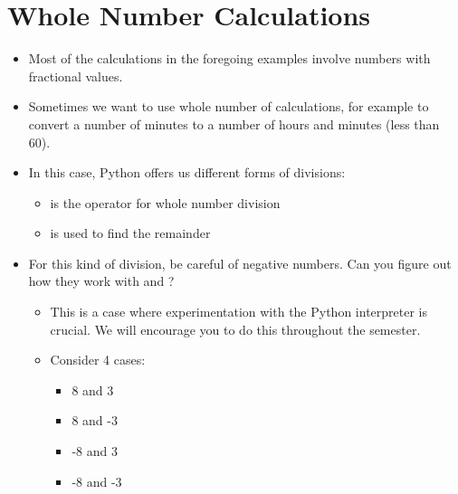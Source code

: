 \documentclass[letterpaper,10pt,english]{sphinxmanual}
\begin{document}
\section{Whole Number Calculations}
\label{\detokenize{lecture_notes/lec02_calculator:whole-number-calculations}}\begin{itemize}
\item {} 
Most of the calculations in the foregoing examples involve numbers
with fractional values.

\item {} 
Sometimes we want to use whole number of calculations, for example
to convert a number of minutes to a number of hours and minutes
(less than 60).

\item {} 
In this case, Python offers us different forms of divisions:
\begin{itemize}
\item {} 
\sphinxcode{\sphinxupquote{//}} is the operator for whole number division

\item {} 
\sphinxcode{\sphinxupquote{\%}} is used to find the remainder

\end{itemize}

\item {} 
For this kind of division, be careful of negative numbers.  Can you
figure out how they work with \sphinxcode{\sphinxupquote{//}} and \sphinxcode{\sphinxupquote{\%}}?
\begin{itemize}
\item {} 
This is a case where experimentation with the Python interpreter
is crucial.  We will encourage you to do this throughout the
semester.

\item {} 
 Consider 4 cases:
\begin{itemize}
\item {} 
8 and 3

\item {} 
8 and -3

\item {} 
-8 and 3

\item {} 
-8 and -3

\end{itemize}

\end{itemize}

\end{itemize}
\end{document}
